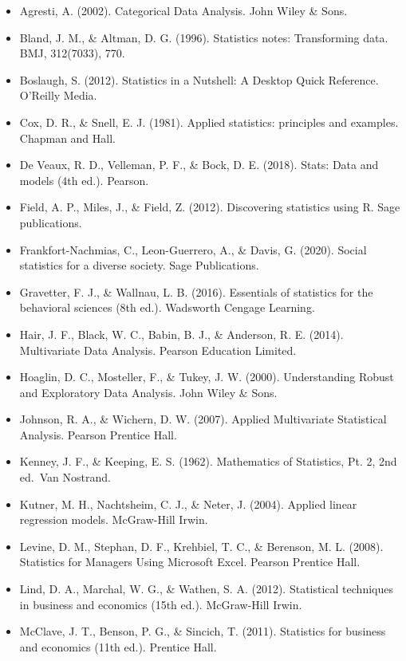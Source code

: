 \documentclass[
  b5paper]{book}
\providecommand{\tightlist}{%
  \setlength{\itemsep}{0pt}\setlength{\parskip}{0pt}}
\begin{document}
\begin{itemize}
\tightlist
\item
  Agresti, A. (2002). Categorical Data Analysis. John Wiley \& Sons.
\item
  Bland, J. M., \& Altman, D. G. (1996). Statistics notes: Transforming data. BMJ, 312(7033), 770.
\item
  Boslaugh, S. (2012). Statistics in a Nutshell: A Desktop Quick Reference. O'Reilly Media.
\item
  Cox, D. R., \& Snell, E. J. (1981). Applied statistics: principles and examples. Chapman and Hall.
\item
  De Veaux, R. D., Velleman, P. F., \& Bock, D. E. (2018). Stats: Data and models (4th ed.). Pearson.
\item
  Field, A. P., Miles, J., \& Field, Z. (2012). Discovering statistics using R. Sage publications.
\item
  Frankfort-Nachmias, C., Leon-Guerrero, A., \& Davis, G. (2020). Social statistics for a diverse society. Sage Publications.
\item
  Gravetter, F. J., \& Wallnau, L. B. (2016). Essentials of statistics for the behavioral sciences (8th ed.). Wadsworth Cengage Learning.
\item
  Hair, J. F., Black, W. C., Babin, B. J., \& Anderson, R. E. (2014). Multivariate Data Analysis. Pearson Education Limited.
\item
  Hoaglin, D. C., Mosteller, F., \& Tukey, J. W. (2000). Understanding Robust and Exploratory Data Analysis. John Wiley \& Sons.
\item
  Johnson, R. A., \& Wichern, D. W. (2007). Applied Multivariate Statistical Analysis. Pearson Prentice Hall.
\item
  Kenney, J. F., \& Keeping, E. S. (1962). Mathematics of Statistics, Pt. 2, 2nd ed.~Van Nostrand.
\item
  Kutner, M. H., Nachtsheim, C. J., \& Neter, J. (2004). Applied linear regression models. McGraw-Hill Irwin.
\item
  Levine, D. M., Stephan, D. F., Krehbiel, T. C., \& Berenson, M. L. (2008). Statistics for Managers Using Microsoft Excel. Pearson Prentice Hall.
\item
  Lind, D. A., Marchal, W. G., \& Wathen, S. A. (2012). Statistical techniques in business and economics (15th ed.). McGraw-Hill Irwin.
\item
  McClave, J. T., Benson, P. G., \& Sincich, T. (2011). Statistics for business and economics (11th ed.). Prentice Hall.

\end{itemize}
\end{document}
